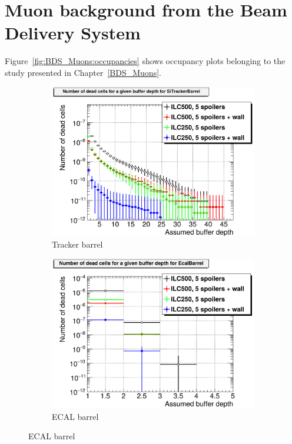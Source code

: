 \chapter{Muon background from the Beam Delivery System}
\label{Appendix:BDS_Muons}
Figure~\ref{fig:BDS_Muons:occupancies} shows occupancy plots belonging to the study presented in Chapter~\ref{BDS_Muons}.
  \begin{figure}[htbp]
 \centering
  \begin{subfigure}[b]{0.49\textwidth}
   \centering
    \includegraphics[width=\textwidth]{Figures/BDS_muons/Occupancy_Comparison_All_layers_deadcells_SiTrackerBarrel.png}
   \caption{Tracker barrel}
   \end{subfigure}
   \hfill
    \begin{subfigure}[b]{0.49\textwidth}
   \centering
    \includegraphics[width=\textwidth]{Figures/BDS_muons/Occupancy_Comparison_All_layers_deadcells_EcalBarrel.png}
   \caption{ECAL barrel}
   \end{subfigure}
  \end{figure}
